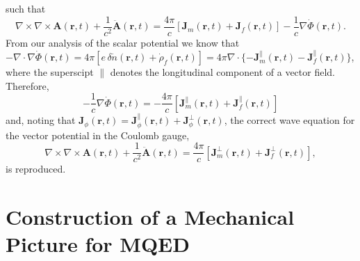 \documentclass{article}
\begin{document}
such that
\begin{equation}
\nabla\times\nabla\times\mathbf{A}(\mathbf{r},t) + \frac{1}{c^2}\ddot{\mathbf{A}}(\mathbf{r},t) = \frac{4\pi}{c}\left[\mathbf{J}_m(\mathbf{r},t) + \mathbf{J}_f(\mathbf{r},t)\right] - \frac{1}{c}\nabla\dot{\Phi}(\mathbf{r},t).
\end{equation}
From our analysis of the scalar potential we know that $-\nabla\cdot\nabla\dot{\Phi}(\mathbf{r},t) = 4\pi\left[e\,\delta\dot{n}(\mathbf{r},t) + \dot{\rho}_f(\mathbf{r},t)\right] = 4\pi\nabla\cdot\{-\mathbf{J}_m^\parallel(\mathbf{r},t) - \mathbf{J}_f^\parallel(\mathbf{r},t)\}$, where the superscipt $\parallel$ denotes the longitudinal component of a vector field. Therefore,
\begin{equation}
-\frac{1}{c}\nabla\dot{\Phi}(\mathbf{r},t) = -\frac{4\pi}{c}\left[\mathbf{J}_m^\parallel(\mathbf{r},t) + \mathbf{J}_f^\parallel(\mathbf{r},t)\right]
\end{equation}
and, noting that $\mathbf{J}_\phi(\mathbf{r},t) = \mathbf{J}_\phi^\parallel(\mathbf{r},t) + \mathbf{J}_\phi^\perp(\mathbf{r},t)$, the correct wave equation for the vector potential in the Coulomb gauge,
\begin{equation}\label{eq:vectorPotentialWaveEq}
\nabla\times\nabla\times\mathbf{A}(\mathbf{r},t) + \frac{1}{c^2}\ddot{\mathbf{A}}(\mathbf{r},t) = \frac{4\pi}{c}\left[\mathbf{J}^\perp_{m}(\mathbf{r},t) + \mathbf{J}^\perp_{f}(\mathbf{r},t)\right],
\end{equation}
is reproduced.



















\section{Construction of a Mechanical Picture for MQED}
\end{document}
